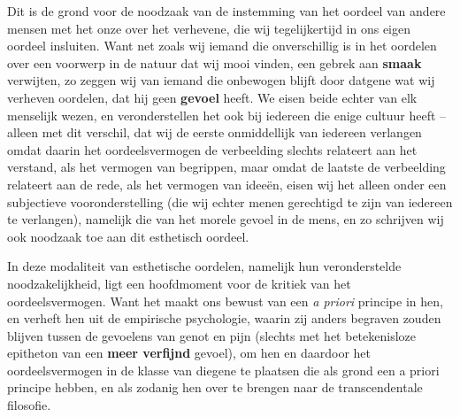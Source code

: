 Dit is de grond voor de noodzaak van de instemming van het oordeel van andere mensen met het onze over het verhevene, die wij tegelijkertijd in ons eigen oordeel insluiten. Want net zoals wij iemand die onverschillig is in het oordelen over een voorwerp in de natuur dat wij mooi vinden, een gebrek aan \textbf{smaak} verwijten, zo zeggen wij van iemand die onbewogen blijft door datgene wat wij verheven oordelen, dat hij geen \textbf{gevoel} heeft. We eisen beide echter van elk menselijk wezen, en veronderstellen het ook bij iedereen die enige cultuur heeft – alleen met dit verschil, dat wij de eerste onmiddellijk van iedereen verlangen omdat daarin het oordeelsvermogen de verbeelding slechts relateert aan het verstand, als het vermogen van begrippen, maar omdat de laatste de verbeelding relateert aan de rede, als het vermogen van ideeën, eisen wij het alleen onder een subjectieve vooronderstelling (die wij echter menen gerechtigd te zijn van iedereen te verlangen), namelijk die van het morele gevoel in de mens, en zo schrijven wij ook noodzaak toe aan dit esthetisch oordeel.

In deze modaliteit van esthetische oordelen, namelijk hun veronderstelde noodzakelijkheid, ligt een hoofdmoment voor de kritiek van het oordeelsvermogen. Want het maakt ons bewust van een \textit{a priori} principe in hen, en verheft hen uit de empirische psychologie, waarin zij anders begraven zouden blijven tussen de gevoelens van genot en pijn (slechts met het betekenisloze epitheton van een \textbf{meer verfijnd} gevoel), om hen en daardoor het oordeelsvermogen in de klasse van diegene te plaatsen die als grond een a priori principe hebben, en als zodanig hen over te brengen naar de transcendentale filosofie.

